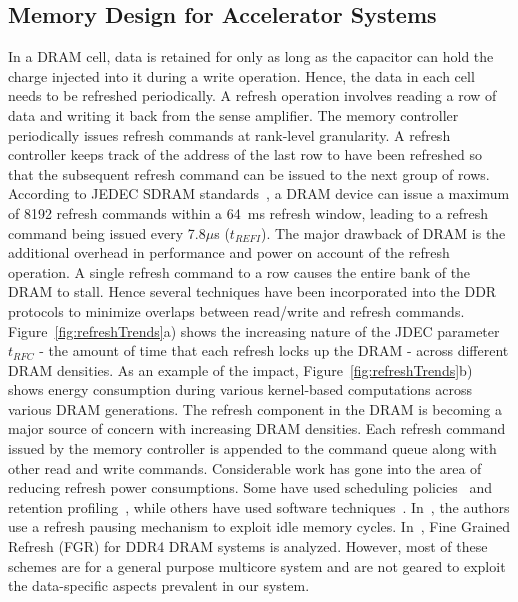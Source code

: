 \subsection{Memory Design for Accelerator Systems}

In a DRAM cell, data is retained for only as long as the capacitor can hold the charge injected into it during a write operation. Hence, the data in each cell needs to be refreshed periodically. A refresh operation involves reading a row of data and writing it back from the sense amplifier. The memory controller periodically issues refresh commands at rank-level granularity. A refresh controller keeps track of the address of the last row to have been refreshed so that the subsequent refresh command can be issued to the next group of rows. According to JEDEC SDRAM standards~\cite{jedec-sdram-standards}, a DRAM device can issue a maximum of 8192 refresh commands within a 64~ms refresh window, leading to a refresh command being issued every 7.8$\mu$s ($t_{REFI}$). The major drawback of DRAM is the additional overhead in performance and power on account of the refresh operation. A single refresh command to a row causes the entire bank of the DRAM to stall. Hence several techniques have been incorporated into the DDR protocols to minimize overlaps between read/write and refresh commands. Figure~\ref{fig:refreshTrends}a) shows the increasing nature of the JDEC parameter $t_{RFC}$ - the amount of time that each refresh locks up the DRAM - across different DRAM densities. As an example of the impact, Figure~\ref{fig:refreshTrends}b) shows energy consumption during various kernel-based computations across various DRAM generations. The refresh component in the DRAM is becoming a major source of concern with increasing DRAM densities. Each refresh command issued by the memory controller is appended to the command queue along with other read and write commands.  
Considerable work has gone into the area of reducing refresh power consumptions. Some have used scheduling policies~\cite{Stuecheli2010} and retention profiling~\cite{Liu2012}, while others have used software techniques~\cite{Liu2012}. In~\cite{Nair2013}, the authors use a refresh pausing mechanism to exploit idle memory cycles. In~\cite{Mukundan2013}, Fine Grained Refresh (FGR) for DDR4 DRAM systems is analyzed. 
However, most of these schemes are for a general purpose multicore system and are not geared to exploit the data-specific aspects prevalent in our system. 


